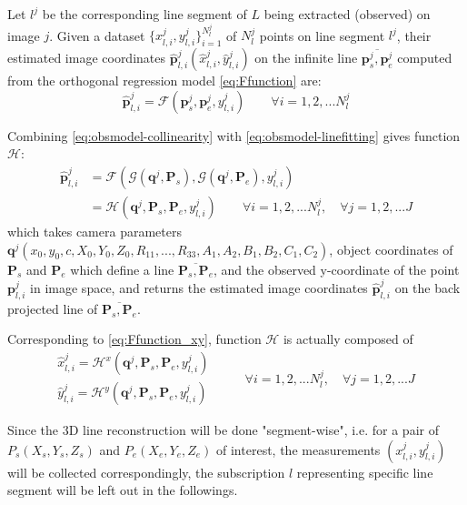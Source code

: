 Let $l^j$ be the corresponding line segment of $L$ being extracted (observed) on image $j$. Given a dataset $\{x^j_{l,i},y^j_{l,i}\}^{N^j_l}_{i=1}$ of $N^j_l$ points on line segment $l^j$, their estimated image coordinates $\hat{\mathbf{p}}^j_{l,i}(\hat{x}^j_{l,i},\hat{y}^j_{l,i})$ on the infinite line $\overline{\mathbf{p}^j_s,\mathbf{p}^j_e}$ computed from the orthogonal regression model \eqref{eq:Ffunction} are:
\begin{equation} \label{eq:obsmodel-linefitting}
\hat{\mathbf{p}}^j_{l,i} = \mathcal{F}(\mathbf{p}^j_s,\mathbf{p}^j_e,y^j_{l,i})
\qquad
\forall i=1,2,...N^j_l
\end{equation}

Combining \eqref{eq:obsmodel-collinearity} with \eqref{eq:obsmodel-linefitting} gives function $\mathcal{H}$:
\begin{equation} \label{eq:Hfunction}
\begin{split}
\hat{\mathbf{p}}^j_{l,i} &= \mathcal{F}(\mathcal{G}(\mathbf{q}^j,\mathbf{P}_s),\mathcal{G}(\mathbf{q}^j,\mathbf{P}_e),y^j_{l,i})\\
&=\mathcal{H}(\mathbf{q}^j,\mathbf{P}_s,\mathbf{P}_e,y^j_{l,i})
\qquad
\forall i=1,2,...N^j_l,\quad\forall j=1,2,...J
\end{split}
\end{equation}
which takes camera parameters $\mathbf{q}^j(x_0,y_0,c,X_0,Y_0,Z_0,R_{11},...,R_{33},A_1,A_2,B_1,B_2,C_1,C_2)$, object coordinates of $\mathbf{P}_s$ and $\mathbf{P}_e$ which define a line $\overline{\mathbf{P}_s,\mathbf{P}_e}$, and the observed y-coordinate of the point $\mathbf{p}^j_{l,i}$ in image space, and returns the estimated image coordinates $\hat{\mathbf{p}}^j_{l,i}$ on the back projected line of $\overline{\mathbf{P}_s,\mathbf{P}_e}$.

Corresponding to \cref{eq:Ffunction_xy}, function $\mathcal{H}$ is actually composed of
\begin{equation} \label{eq:Hfunction_xy}
\begin{split}
\hat{x}^j_{l,i} = \mathcal{H}^x(\mathbf{q}^j,\mathbf{P}_s,\mathbf{P}_e,y^j_{l,i})\\
\hat{y}^j_{l,i} = \mathcal{H}^y(\mathbf{q}^j,\mathbf{P}_s,\mathbf{P}_e,y^j_{l,i})
\end{split}
\qquad
\begin{split}
\forall i=1,2,...N^j_l,\quad\forall j=1,2,...J
\end{split}
\end{equation}

Since the 3D line reconstruction will be done "segment-wise", i.e. for a pair of $P_s(X_s,Y_s,Z_s)$ and $P_e(X_e,Y_e,Z_e)$ of interest, the measurements $(x^j_{l,i},y^j_{l,i})$ will be collected correspondingly, the subscription $l$ representing specific line segment will be left out in the followings.

